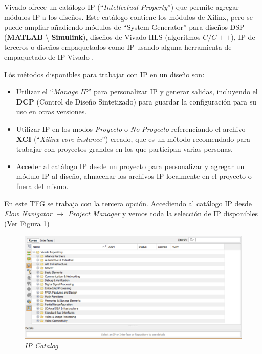 Vivado ofrece un catálogo IP (``\textit{Intellectual Property}'') que permite agregar módulos IP a los 
diseños. Este catálogo contiene los módulos de Xilinx, pero se puede ampliar añadiendo módulos de ``System 
Generator'' para diseños DSP (\textbf{MATLAB} \textbackslash{} \textbf{Simulink}), diseños de Vivado HLS (algoritmos 
$C / C++$), IP de terceros o diseños empaquetados como IP usando alguna herramienta de empaquetado de IP Vivado \cite{ip}.

Lós métodos disponibles para trabajar con IP en un diseño son:

\begin{itemize}
    \item Utilizar el ``\textit{Manage IP}'' para personalizar IP y generar salidas, incluyendo el \textbf{DCP} 
    (Control de Diseño Sintetizado) para guardar la configuración para su uso en otras versiones.
    \item Utilizar IP en los modos \textit{Proyecto} o \textit{No Proyecto} referenciando el archivo \textbf{XCI} 
    (``\textit{Xilinx core instance}'') creado, que es un método recomendado para trabajar con proyectos 
    grandes en los que participan varias personas.
    \item Acceder al catálogo IP desde un proyecto para personalizar y agregar un módulo IP al diseño, almacenar 
    los archivos IP localmente en el proyecto o fuera del mismo.
\end{itemize}

En este TFG se trabaja con la tercera opción. Accediendo al catálogo IP desde \textit{Flow Navigator} $\rightarrow$ 
\textit{Project Manager} y vemos toda la selección de IP disponibles (Ver Figura \ref{catalogo})

\begin{figure}[H]
    \centering
    \includegraphics[width = 1\textwidth]{imagenes/catalogoip.png}
    \caption{\textit{IP Catalog}}\label{catalogo}
\end{figure}

